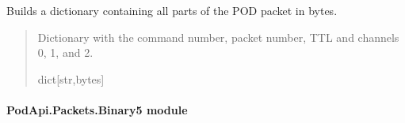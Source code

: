 \documentclass[letterpaper,10pt,english]{sphinxmanual}
\begin{document}
\begin{fulllineitems}
\begin{fulllineitems}
\begin{quote}
\begin{description}
\end{description}\end{quote}

\end{fulllineitems}


\begin{fulllineitems}
\label{\detokenize{PodApi.Packets:PodApi.Packets.Binary4.PacketBinary4.UnpackAll}}
\pysigstartsignatures
{}
\pysigstopsignatures
\sphinxAtStartPar
Builds a dictionary containing all parts of the POD packet in bytes.
\begin{quote}\begin{description}
\sphinxAtStartPar
Dictionary with the command number, packet number, TTL                 and channels 0, 1, and 2.

\sphinxAtStartPar
dict{[}str,bytes{]}

\end{description}\end{quote}

\end{fulllineitems}


\end{fulllineitems}



\paragraph{PodApi.Packets.Binary5 module}
\label{\detokenize{PodApi.Packets:module-PodApi.Packets.Binary5}}\label{\detokenize{PodApi.Packets:podapi-packets-binary5-module}}
\end{document}
